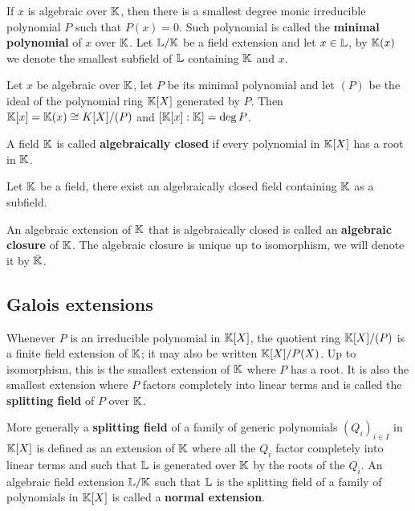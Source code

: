 If $x$ is algebraic over $\mathbb{K}$, then there is a smallest degree monic
irreducible polynomial $P$ such that $P(x)=0$. Such polynomial is
called the \textbf{minimal polynomial} of
$x$ over $\mathbb{K}$.  Let $\mathbb{L}/\mathbb{K}$ be a field extension and let $x\in\mathbb{L}$,
by $\mathbb{K}(x)$ we denote the smallest subfield of $\mathbb{L}$ containing $\mathbb{K}$
and $x$.

\begin{proposition}
  Let $x$ be algebraic over $\mathbb{K}$, let $P$ be its minimal polynomial
  and let $(P)$ be the ideal of the polynomial ring $\mathbb{K}[X]$ generated
  by $P$. Then $\mathbb{K}[x]=\mathbb{K}(x)\cong K[X]/(P)$ and $[\mathbb{K}[x]:\mathbb{K}] = \deg P$.
\end{proposition}

A field $\mathbb{K}$ is called
\textbf{algebraically closed} if every polynomial in $\mathbb{K}[X]$ has a
root in $\mathbb{K}$.

\begin{theorem}
  Let $\mathbb{K}$ be a field, there exist an algebraically closed field
  containing $\mathbb{K}$ as a subfield.
\end{theorem}

An algebraic extension of $\mathbb{K}$ that is algebraically closed is called
an 
\textbf{algebraic closure} of $\mathbb{K}$. The algebraic closure is unique up
to isomorphism, we will denote it by $\bar{\mathbb{K}}$.


\subsection{Galois extensions}
\label{sec:basic-galois-theory:galois-extensions}
Whenever $P$ is an irreducible polynomial in $\mathbb{K}[X]$, the quotient
ring $\mathbb{K}[X]/(P)$ is a finite field extension of $\mathbb{K}$; it may also be
written $\mathbb{K}[X]/P(X)$. Up to isomorphism, this is the smallest
extension of $\mathbb{K}$ where $P$ has a root. It is also the smallest
extension where $P$ factors completely into linear terms and is called
the \textbf{splitting field} of $P$ over
$\mathbb{K}$. 

More generally a \textbf{splitting field} of a family of generic
polynomials $(Q_i)_{i\in I}$ in $\mathbb{K}[X]$ is defined as an extension of
$\mathbb{K}$ where all the $Q_i$ factor completely into linear terms and such
that $\mathbb{L}$ is generated over $\mathbb{K}$ by the roots of the $Q_i$. An
algebraic field extension $\mathbb{L}/\mathbb{K}$ such that $\mathbb{L}$ is the splitting
field of a family of polynomials in $\mathbb{K}[X]$ is called a
  \textbf{normal
  extension}.

